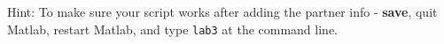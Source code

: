 \documentclass[letterpaper,10pt]{article}
\begin{document}
Hint: To make sure your script works after adding the partner info - {\bf save}, quit Matlab, restart Matlab, and type \verb+lab3+ at the command line.



\end{document}
